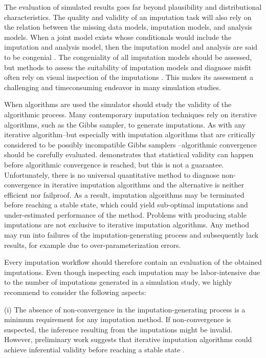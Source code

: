 \documentclass[bimj,fleqn]{w-art}
\begin{document}
The evaluation of simulated results goes far beyond plausibility and distributional characteristics. The quality and validity of an imputation task will also rely on the relation between the missing data models, imputation models, and analysis models. When a joint model exists whose conditionals would include the imputation and analysis model, then the imputation model and analysis are said to be congenial \citep{meng94, bart2015}. The congeniality of all imputation models should be assessed, but methods to assess the suitability of imputation models and diagnose misfit often rely on visual inspection of the imputations \citep[see e.g.][]{abayomi2008diagnostics, bond16}. This makes its assessment a challenging and timeconsuming endeavor in many simulation studies. 

When algorithms are used the simulator should study the validity of the algorithmic process. Many contemporary imputation techniques rely on iterative algorithms, such as the Gibbs sampler, to generate imputations. As with any iterative algorithm--but especially with imputation algorithms that are critically considered to be possibly incompatible Gibbs samplers \citep[PIGS,][]{li2012imputing}--algorithmic convergence should be carefully evaluated. \citet{ober21} demonstrates that statistical validity can happen before algorithmic convergence is reached, but this is not a guarantee. Unfortunately, there is no universal quantitative method to diagnose non-convergence in iterative imputation algorithms \citep{zhu15, ober21} and the alternative \citep[visual inspection of the imputation algorithm;][]{buur18} is neither efficient nor failproof. As a result, imputation algorithms may be terminated before reaching a stable state, which could yield sub-optimal imputations and under-estimated performance of the method. Problems with producing stable imputations are not exclusive to iterative imputation algorithms. Any method may run into failures of the imputation-generating process and subsequently lack results, for example due to over-parameterization errors.

Every imputation workflow should therefore contain an evaluation of the obtained imputations. Even though inspecting each imputation may be labor-intensive due to the number of imputations generated in a simulation study, we highly recommend to consider the following aspects:

(i) The absence of non-convergence in the imputation-generating process is a minimum requirement for any imputation method. If non-convergence is suspected, the inference resulting from the imputations might be invalid. However, preliminary work suggests that iterative imputation algorithms could achieve inferential validity before reaching a stable state \citep{ober21}. 
\end{document}

